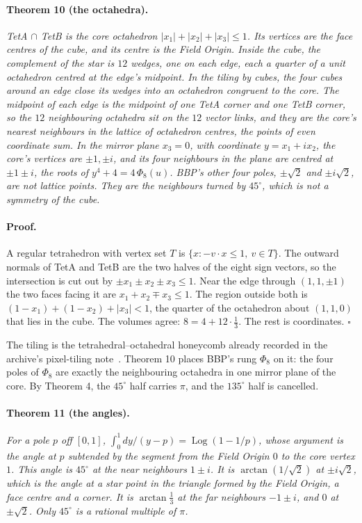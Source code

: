 \documentclass[twocolumn]{iopjournal}
\begin{document}
\paragraph{Theorem 10 (the octahedra).} \textit{TetA $\cap$ TetB is
the core octahedron $|x_1| + |x_2| + |x_3| \le 1$. Its vertices are
the face centres of the cube, and its centre is the Field Origin.
Inside the cube, the complement of the star is $12$ wedges, one on each
edge, each a quarter of a unit octahedron centred at the edge's
midpoint. In the tiling by cubes, the four cubes around an edge close
its wedges into an octahedron congruent to the core. The midpoint of
each edge is the midpoint of one TetA corner and one TetB corner, so the
$12$ neighbouring octahedra sit on the $12$ vector links, and they are
the core's nearest neighbours in the lattice of octahedron centres,
the points of even coordinate sum. In the mirror plane $x_3 = 0$,
with coordinate $y = x_1 + i x_2$, the core's vertices are
$\pm1, \pm i$, and its four neighbours in the plane are centred at
$\pm1 \pm i$, the roots of $y^4 + 4 = 4\,\Phi_8(u)$. BBP's other four
poles, $\pm\sqrt2$ and $\pm i\sqrt2$, are not lattice points. They are
the neighbours turned by $45^\circ$, which is not a symmetry of the
cube.}

\paragraph{Proof.} A regular tetrahedron with vertex set $T$ is
$\{x : -v\cdot x \le 1,\ v \in T\}$. The outward normals of TetA and
TetB are the two halves of the eight sign vectors, so the intersection
is cut out by $\pm x_1 \pm x_2 \pm x_3 \le 1$. Near the edge through
$(1,1,\pm1)$ the two faces facing it are $x_1 + x_2 \mp x_3 \le 1$.
The region outside both is $(1 - x_1) + (1 - x_2) + |x_3| < 1$,
the quarter of the octahedron about $(1,1,0)$ that lies in the cube.
The volumes agree: $8 = 4 + 12 \cdot \tfrac13$. The rest is
coordinates. \hfill $\square$

\medskip
\noindent
The tiling is the tetrahedral--octahedral honeycomb already recorded
in the archive's pixel-tiling note~\cite{Nelson2026pixel}. Theorem 10
places BBP's rung $\Phi_8$ on it: the four poles of $\Phi_8$ are
exactly the neighbouring octahedra in one mirror plane of the core. By
Theorem 4, the $45^\circ$ half carries $\pi$, and the $135^\circ$ half
is cancelled.

\paragraph{Theorem 11 (the angles).} \textit{For a pole $p$ off
$[0,1]$, $\int_0^1 dy/(y - p) = \operatorname{Log}(1 - 1/p)$, whose
argument is the angle at $p$ subtended by the segment from the Field
Origin $0$ to the core vertex $1$. This angle is $45^\circ$ at the near
neighbours $1 \pm i$. It is $\arctan(1/\sqrt2)$ at $\pm i\sqrt2$, which
is the angle at a star point in the triangle formed by the Field
Origin, a face centre and a corner. It is $\arctan\frac13$ at the far
neighbours $-1 \pm i$, and $0$ at $\pm\sqrt2$. Only $45^\circ$ is a
rational multiple of $\pi$.}
\end{document}

